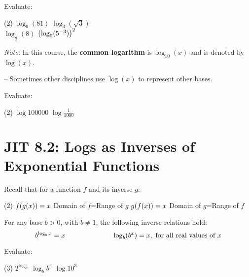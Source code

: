 \documentclass[../mathNotesPreamble]{subfiles}
\begin{document}
  \begin{center}
  \end{center}
  \begin{ex*}
    Evaluate:
    \begin{extasks}(2)
      \task $\log_9(81)$
      \task $\log_3(\sqrt3)$\\
      \task $\log_{\frac{1}{2}}(8)$
      \task $\parens{\log_5(5\inv[3])}^2$\\
    \end{extasks}
  \end{ex*}
  \pagebreak
  
  \textit{Note:} In this course, the \textbf{common logarithm} is $\log_{10}(x)$ and is denoted by $\log(x)$. 
  
  -- Sometimes other disciplines use $\log(x)$ to represent other bases.
  \begin{ex*}
    Evaluate:
    \begin{extasks}(2)
      \task $\log 100000$
      \task $\log \frac{1}{1000}$\\
    \end{extasks}
  \end{ex*}
\section{JIT 8.2: Logs as Inverses of Exponential Functions}
  Recall that for a function $f$ and its inverse $g$:
  \begin{tasks}[style=itemize](2)
    \task $f\parens{g(x)}=x$
    \task Domain of $f$=Range of $g$
    \task $g\parens{f(x)}=x$
    \task Domain of $g$=Range of $f$\\
  \end{tasks}

  \begin{thmBox*}
    For any base $b>0$, with $b\neq 1$, the following inverse relations hold:
      $$b^{\log_bx}=x \hspace*{0.2\linewidth}\log_b(b^x)=x,\text{ for all real values of }x$$
  \end{thmBox*}

  \begin{ex*}
    Evaluate:
    \begin{extasks}(3)
      \task $2^{\log_28}$
      \task $\log_bb^\pi$
      \task $\log10^3$
    \end{extasks}
  \end{ex*}
  \vfill
  \pagebreak
  
\end{document}
